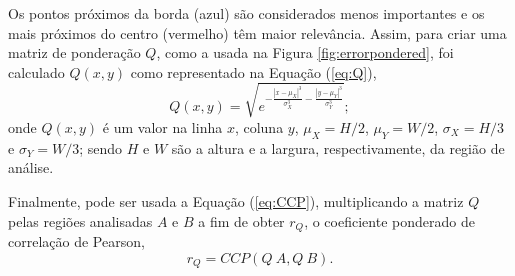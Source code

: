 Os pontos próximos da borda (azul) são considerados menos importantes e os mais próximos do centro 
 (vermelho) têm maior relevância.
Assim, para criar uma matriz de ponderação $Q$, como a usada na Figura \ref{fig:errorpondered},
foi calculado $Q(x,y)$ como representado na Equação (\ref{eq:Q}),
\begin{equation}\label{eq:Q}
 Q(x,y) = \sqrt{e^{ -\frac{|x-\mu_X|^3}{\sigma_X^3}-\frac{|y-\mu_Y|^3}{\sigma_Y^3}  }};
\end{equation}
onde $Q(x,y)$ é um valor na linha $x$, coluna $y$,
$\mu_X=H/2$, $\mu_Y=W/2$, $\sigma_X=H/3$ e $\sigma_Y=W/3$; sendo $H$ e $W$
são a altura e a largura, respectivamente, da região de análise.

Finalmente, pode ser usada a Equação (\ref{eq:CCP}), multiplicando a matriz $Q$ pelas 
regiões analisadas $A$ e $B$ a fim de obter $r_Q$, o coeficiente ponderado de correlação de Pearson,
\begin{equation}\label{eq:rw}
 r_Q = CCP(Q~A, Q~B).
\end{equation}
